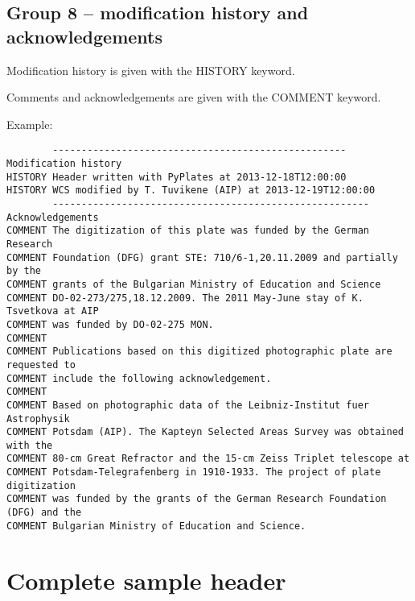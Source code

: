 \documentclass[11pt]{ivoa}
\begin{document}
\subsection{Group 8 – modification history and acknowledgements}

Modification history is given with the HISTORY keyword.

Comments and acknowledgements are given with the COMMENT keyword.

Example:

\begin{lstlisting}
        --------------------------------------------------- Modification history
HISTORY Header written with PyPlates at 2013-12-18T12:00:00
HISTORY WCS modified by T. Tuvikene (AIP) at 2013-12-19T12:00:00
        ------------------------------------------------------- Acknowledgements
COMMENT The digitization of this plate was funded by the German Research
COMMENT Foundation (DFG) grant STE: 710/6-1,20.11.2009 and partially by the
COMMENT grants of the Bulgarian Ministry of Education and Science
COMMENT DO-02-273/275,18.12.2009. The 2011 May-June stay of K. Tsvetkova at AIP
COMMENT was funded by DO-02-275 MON.
COMMENT
COMMENT Publications based on this digitized photographic plate are requested to
COMMENT include the following acknowledgement.
COMMENT
COMMENT Based on photographic data of the Leibniz-Institut fuer Astrophysik
COMMENT Potsdam (AIP). The Kapteyn Selected Areas Survey was obtained with the
COMMENT 80-cm Great Refractor and the 15-cm Zeiss Triplet telescope at
COMMENT Potsdam-Telegrafenberg in 1910-1933. The project of plate digitization
COMMENT was funded by the grants of the German Research Foundation (DFG) and the
COMMENT Bulgarian Ministry of Education and Science.
\end{lstlisting}


\section{Complete sample header}
\label{sect:samplehdr}
\end{document}
